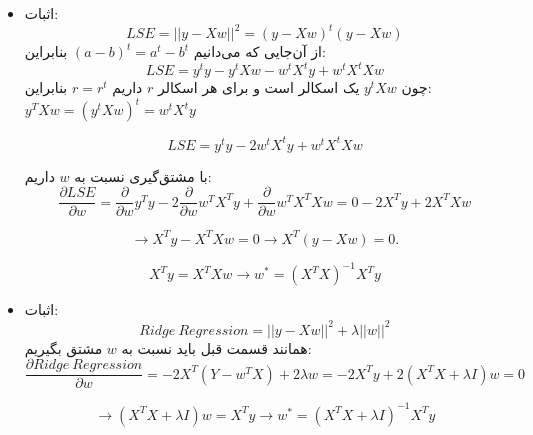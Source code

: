 
\begin{itemize}
	\item اثبات:
	$$
	LSE = ||y - Xw||^2 = (y - Xw)^t(y - Xw)
	$$
	از آن‌جایی که می‌دانیم 
	$(a - b)^t = a^t - b^t$
	بنابراین:
	$$
	LSE = y^ty - y^tXw - w^tX^ty + w^tX^tXw
	$$
	چون 
	$y^tXw$
	یک اسکالر است و برای هر اسکالر $r$ داریم
	 $r = r^t$ 
	 بنابراین:
	 $y^TXw = (y^tXw)^t = w^tX^ty$
	 
	 $$LSE =
	 	y^t y - 2 w^t X^t y + w^t X^t X w
	  $$
	  
	  با مشتق‌گیری نسبت به $w$ داریم:
	  $$
	  \frac{\partial LSE}{\partial w} = \frac{\partial}{\partial w} y^T y - 2 \frac{\partial}{\partial w} w^T X^T y + \frac{\partial}{\partial w} w^T X^T X w = 0 - 2X^Ty + 2X^TXw 
	  $$
	  
	  $$
	  \rightarrow X^T y - X^T X w = 0 \rightarrow X^T(y - X  w) = 0.
	  $$
	  
	  $$
	  X^Ty = X^T X w \rightarrow w^* = (X^T X)^{-1}X^T y 
	  $$
	\item اثبات:
	$$
	Ridge \: Regression = ||y - Xw||^2 + \lambda ||w||^2
	$$
	همانند قسمت قبل باید نسبت به $w$ مشتق بگیریم:
	$$
	\frac{\partial Ridge \: Regression}{\partial w} = -2X^T(Y - w^TX) + 2\lambda w = -2X^Ty + 2(X^TX + \lambda I)w = 0
	$$
	
	$$
	\rightarrow (X^TX + \lambda I)w = X^Ty \rightarrow w^* = (X^TX + \lambda I)^{-1}X^Ty
	$$
\end{itemize}